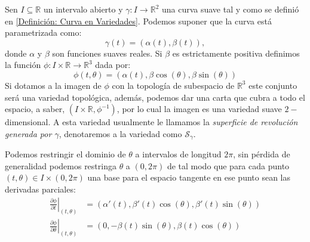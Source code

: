 \begin{example}\label{Ejemplo: Métrica - Superficies de Revolución}
	Sen $I \subseteq \mathbb{R}$ un intervalo abierto y $\gamma: I \to \mathbb{R}^{2}$ una curva suave tal y como se definió en \ref{Definición: Curva en Variedades}. Podemos suponer que la curva está parametrizada como:
	\[
		\gamma(t) = (\alpha(t), \beta(t)),
	\]
	donde $\alpha$ y $\beta$ son funciones suaves reales. Si $\beta$ es estrictamente positiva definimos la función $\phi: I \times \mathbb{R} \to \mathbb{R}^{3}$ dada por:
	\[
		\phi(t,\theta) = (\alpha(t),\beta \cos(\theta), \beta\sin(\theta))
	\]
	Si dotamos a la imagen de $\phi$ con la topología de subespacio de $\mathbb{R}^{3}$ este conjunto será una variedad topológica, además, podemos dar una carta que cubra a todo el espacio, a saber, $(I \times \mathbb{R}, \phi^{-1})$, por lo cual la imagen es una variedad suave $2-$dimensional. A esta variedad usualmente le llamamos la \textit{superficie de revolución generada por $\gamma$}, denotaremos a la variedad como $\mathcal{S}_{\gamma}$.

	Podemos restringir el dominio de $\theta$ a intervalos de longitud $2\pi$, sin pérdida de generalidad podemos restringa $\theta$ a $(0,2\pi)$ de tal modo que para cada punto $(t,\theta) \in I \times (0,2\pi)$ una base para el espacio tangente en ese punto sean las derivadas parciales:
	\begin{align*}
		\left. \frac{\partial \phi}{\partial t} \right|_{(t,\theta)}
		 & =
		(\alpha'(t), \beta'(t) \cos(\theta), \beta'(t)\sin(\theta)) \\
		\left. \frac{\partial \phi}{\partial \theta} \right|_{(t,\theta)}
		 & =
		(0 , -\beta(t) \sin(\theta), \beta(t)\cos(\theta))
	\end{align*}


\end{example}
